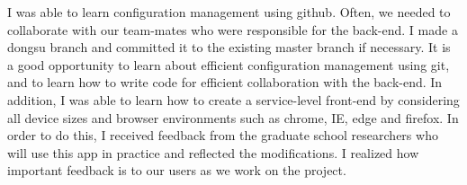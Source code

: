 \documentclass[letterpaper, 10 pt, conference]{ieeeconf}  %
\begin{document}
I was able to learn configuration management using github. Often, we needed to collaborate with our team-mates who were responsible for the back-end. I made a dongsu branch and committed it to the existing master branch if necessary. It is a good opportunity to learn about efficient configuration management using git, and to learn how to write code for efficient collaboration with the back-end. In addition, I was able to learn how to create a service-level front-end by considering all device sizes and browser environments such as chrome, IE, edge and firefox. In order to do this, I received feedback from the graduate school researchers who will use this app in practice and reflected the modifications. I realized how important feedback is to our users as we work on the project.\\
\end{document}
